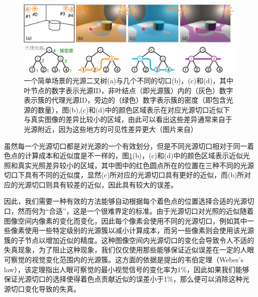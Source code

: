 \begin{figure}
\begin{fullwidth}
	\includegraphics[width=1.0\thewidth]{figures/ir/lightcuts}
	\caption{一个简单场景的光源二叉树(a)与几个不同的切口(b)，(c)和(d)，其中叶节点的数字表示光源ID，非叶结点（即光源簇）内的（灰色）数字表示簇的代理光源ID，旁边的（绿色）数字表示簇的密度（即包含光源的数量），图(b),(c)和(d)中的颜色区域表示在对应光源切口近似下与真实图像的差异比较小的区域，由此可以看出这些差异通常来自于光源附近，因为这些地方的可见性差异更大（图片来自\cite{a:Lightcuts:AScalableApproachtoIllumination}）}
	\label{f:ir-lightcuts}
\end{fullwidth}
\end{figure}

虽然每一个光源切口都是对光源的一个有效划分，但是不同光源切口相对于同一着色点的计算成本和近似度是不一样的，图\ref{f:ir-lightcuts}(b)，(c)和(d)中的颜色区域表示近似光照和真实光照差异较小的区域，其中图中的红色圆点所在的位置在三种不同的光源切口下具有不同的近似度，显然(c)所对应的光源切口具有更好的近似，而(b)所对应的光源切口则具有较差的近似，因此具有较大的误差。

因此，我们需要一种有效的方法能够自动根据每个着色点的位置选择合适的光源切口，然而何为“合适”，这是一个很难界定的标准。由于光源切口对光照的近似随着图像空间内像素的变化而变化，因此每个像素会使用不同的光源切口，例如其中一些像素使用一些特定级别的光源簇以减小计算成本，而另一些像素则会使用该光源簇的子节点以增加近似的精度。这种图像空间内光源切口的变化会导致令人不适的失真现象，为了阻止这种现象，我们仅仅使用那些能够保证近似误差在一定的人眼可察觉的视觉变化范围内的光源簇。这方面的依据是\cite{a:Luminancedifferencethresholds}提出的韦伯定理（Weber’s law），该定理指出人眼可察觉的最小视觉信号的变化率为1\%，因此如果我们能够保证光源切口的选择使得着色点贡献近似的误差小于1\%，那么便可以消除这种光源切口变化导致的失真。





